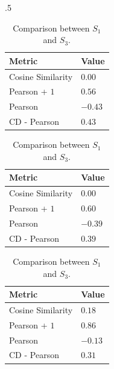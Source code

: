 \begin{table}[!htb]
    \begin{subtable}{.5\linewidth}
        \centering
        
            \begin{tabular}{ll}
            \hline
            Metric            & Value  \\
            \hline
            Cosine Similarity &  $0.00$  \\
            Pearson + $1$       &  $0.56$  \\
            Pearson           & $-0.43$  \\
            CD - Pearson      &  $0.43$  \\
            \hline
            \end{tabular}

            \caption{Comparison between $S_1$ and $S_2$.}
            
            \vspace{1em}

            \begin{tabular}{ll}
            \hline
            Metric            & Value  \\
            \hline
            Cosine Similarity &  $0.00$  \\
            Pearson + $1$       &  $0.60$  \\
            Pearson           & $-0.39$  \\
            CD - Pearson      &  $0.39$  \\
            \hline
            \end{tabular}

            \caption{Comparison between $S_1$ and $S_3$.}
            
            \vspace{1em}

            \begin{tabular}{ll}
            \hline
            Metric            & Value  \\
            \hline
            Cosine Similarity &  $0.18$  \\
            Pearson + $1$       &  $0.86$  \\
            Pearson           & $-0.13$  \\
            CD - Pearson      &  $0.31$  \\
            \hline
            \end{tabular}


\end{subtable}
\end{table}
